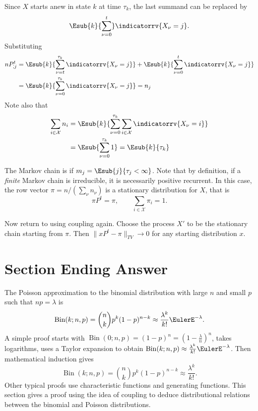 \documentclass[12pt]{article}
\begin{document}
    Since \( X \) starts anew in state \( k \) at time \( \tau_k \), the
    last summand can be replaced by
    \[
        \Esub{k}{\sum\limits_{\nu=0}^t} \indicatorrv{X_{\nu} = j}.
    \] Substituting
    \begin{align*}
        n P_{\dot,j}^{t} &= \Esub{k}{\sum\limits_{\nu=t}^{\tau_k }
        \indicatorrv{X_{\nu} = j}} + \Esub{k}{\sum\limits_{\nu=0}^{t}
        \indicatorrv{X_{\nu} = j}} \\
        &= \Esub{k}{\sum\limits_{\nu=0}^{\tau_k} \indicatorrv{X_{\nu} = j}}
        = n_j
    \end{align*}
    Note also that
    \begin{align*}
        \sum_{i \in \mathcal{X}} n_i &= \Esub{k}{ \sum\limits_{\nu=0}^{\tau_k}
        \sum\limits_{i \in \mathcal{X}} \indicatorrv{X_{\nu} = i}} \\
        &= \Esub{\sum\limits_{\nu=0}^{\tau_k} 1} = \Esub{k}{\tau_k}
    \end{align*}

    The Markov chain is  if \( m_j = \Esub{j}{\tau_j
    < \infty} \).  Note that by definition, if a \emph{finite} Markov
    chain is irreducible, it is necessarily positive recurrent.  In this
    case, the row vector \( \pi = n/(\sum_{\nu} n_\nu) \) is a
    stationary distribution for \( X \), that is
    \[
        \pi P^t = \pi, \qquad \sum_{i \in \mathcal{X}} \pi_i = 1.
    \]

    Now return to using coupling again.  Choose the process \( X' \) to
    be the stationary chain starting from \( \pi \).  Then \( \| x P^t -\pi\|_
    {TV} \to 0 \) for any starting distribution \( x \).

\section*{Section Ending Answer}

The Poisson approximation to the binomial distribution with large \( n \)
and small \( p \) such that \( np = \lambda \) is
\[
    \operatorname{Bin}
    (k; n, p) = \binom{n}{k}p^k(1-p)^{n-k} \approx \frac{\lambda^k}{k!}
    \EulerE^{-\lambda}.
\] A simple proof starts with \(
\operatorname{Bin}
(0; n, p) = (1-p)^n = \left( 1 - \frac{\lambda}{n} \right)^n \), takes
logarithms, uses a Taylor expansion to obtain \(
\operatorname{Bin}
(k; n, p) \approx \frac{\lambda^k}{k!} \EulerE^{-\lambda} \).  Then
mathematical induction gives
\[
    \operatorname{Bin}
    (k; n, p) = \binom{n}{k}p^k(1-p)^{n-k} \approx \frac{\lambda^k}{k!}.
\] Other typical proofs use characteristic functions and generating
functions.  This section gives a proof using the idea of coupling to
deduce distributional relations between the binomial and Poisson
distributions.
\end{document}
